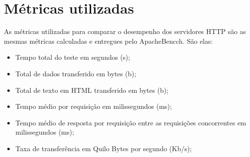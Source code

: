 \section{Métricas utilizadas}
As métricas utilizadas para comparar o desempenho dos servidores HTTP são as 
mesmas métricas calculadas e entregues pelo ApacheBencch. São elas:
\begin{itemize}
	\item Tempo total do teste em segundos (s);
	\item Total de dados transferido em bytes (b);
	\item Total de texto em HTML transferido em bytes (b);
	\item Tempo médio por requisição em milissegundos (ms);
	\item Tempo médio de resposta por requisição entre as requisições 
	concorrentes em milissegundos (ms);
	\item Taxa de transferência em Quilo Bytes por segundo (Kb/s);
\end{itemize}